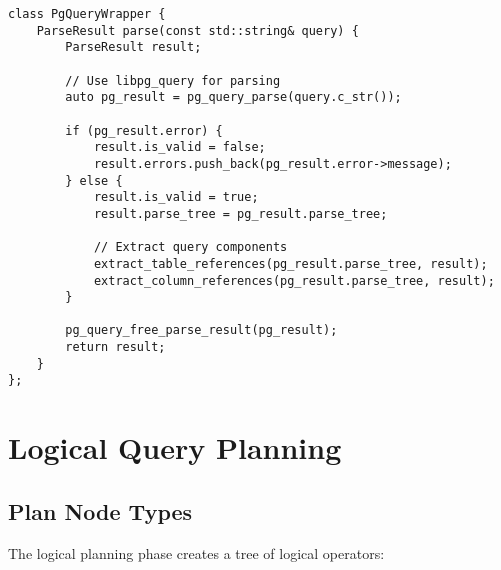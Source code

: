 \documentclass[12pt,a4paper]{article}
\begin{document}
\begin{lstlisting}[style=cpp, caption=AST Processing Example]
class PgQueryWrapper {
    ParseResult parse(const std::string& query) {
        ParseResult result;
        
        // Use libpg_query for parsing
        auto pg_result = pg_query_parse(query.c_str());
        
        if (pg_result.error) {
            result.is_valid = false;
            result.errors.push_back(pg_result.error->message);
        } else {
            result.is_valid = true;
            result.parse_tree = pg_result.parse_tree;
            
            // Extract query components
            extract_table_references(pg_result.parse_tree, result);
            extract_column_references(pg_result.parse_tree, result);
        }
        
        pg_query_free_parse_result(pg_result);
        return result;
    }
};
\end{lstlisting}

\section{Logical Query Planning}

\subsection{Plan Node Types}

The logical planning phase creates a tree of logical operators:
\end{document}
